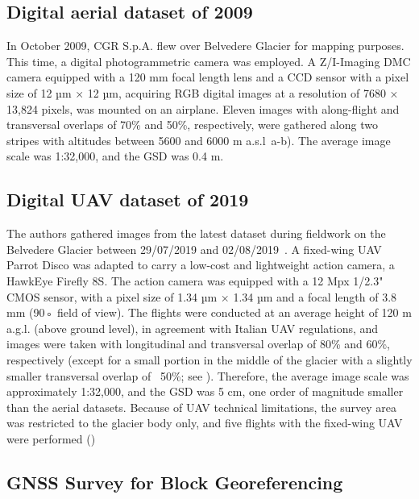 \subsection{Digital aerial dataset of 2009}

In October 2009, CGR S.p.A. flew over Belvedere Glacier for mapping purposes. 
This time, a digital photogrammetric camera was employed.
A Z/I-Imaging DMC camera equipped with a 120 mm focal length lens and a CCD
sensor with a pixel size of 12 µm × 12 µm, acquiring RGB digital images at a resolution of 7680 × 13,824 pixels, was mounted on an airplane. 
Eleven images with along-flight and transversal overlaps of 70\% and 50\%, respectively, were gathered along two stripes with altitudes between 5600 and 6000 m a.s.l~a-b). 
The average image scale was 1:32,000, and the GSD was 0.4 m.

\subsection{Digital UAV dataset of 2019}

The authors gathered images from the latest dataset during fieldwork on the Belvedere Glacier between 29/07/2019 and 02/08/2019~\citep{Ioli2022}. 
A fixed-wing UAV Parrot Disco was adapted to carry a low-cost and lightweight action
camera, a HawkEye Firefly 8S. 
The action camera was equipped with a 12 Mpx 1/2.3" CMOS sensor, with a pixel size of 1.34 µm × 1.34 µm and a focal length of 3.8 mm (90◦ field of view). 
The flights were conducted at an average height of 120 m a.g.l. (above ground level), in agreement with Italian UAV regulations, and images were taken with longitudinal and transversal overlap of 80\% and 60\%, respectively (except for a small portion in the middle of the glacier with a slightly smaller transversal overlap of ~50\%; see ).
Therefore, the average image scale was approximately 1:32,000, and the GSD was 5 cm, one order of magnitude smaller than the aerial datasets. 
Because of UAV technical limitations, the survey area was restricted to the glacier body only, and five flights with the fixed-wing UAV were performed ()


\subsection{GNSS Survey for Block Georeferencing}

